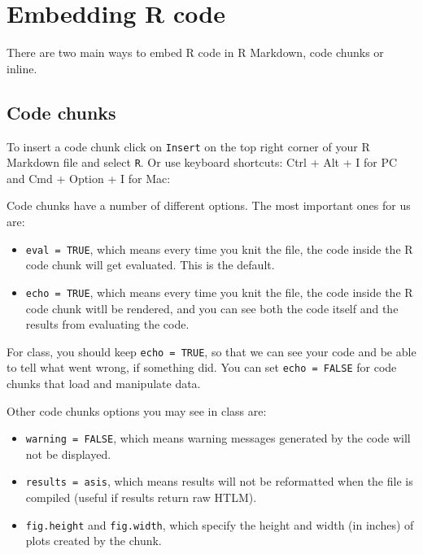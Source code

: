 \documentclass[
  letterpaper,
  DIV=11,
  numbers=noendperiod]{scrreprt}
\providecommand{\tightlist}{%
  \setlength{\itemsep}{0pt}\setlength{\parskip}{0pt}}\usepackage{longtable,booktabs,array}
\begin{document}
\section{Embedding R code}\label{embedding-r-code}

There are two main ways to embed R code in R Markdown, code chunks or
inline.

\subsection{Code chunks}\label{code-chunks}

To insert a code chunk click on \texttt{Insert} on the top right corner
of your R Markdown file and select \texttt{R}. Or use keyboard
shortcuts: Ctrl + Alt + I for PC and Cmd + Option + I for Mac:

Code chunks have a number of different options. The most important ones
for us are:

\begin{itemize}
\tightlist
\item
  \texttt{eval\ =\ TRUE}, which means every time you knit the file, the
  code inside the R code chunk will get evaluated. This is the default.
\item
  \texttt{echo\ =\ TRUE}, which means every time you knit the file, the
  code inside the R code chunk witll be rendered, and you can see both
  the code itself and the results from evaluating the code.
\end{itemize}

For class, you should keep \texttt{echo\ =\ TRUE}, so that we can see
your code and be able to tell what went wrong, if something did. You can
set \texttt{echo\ =\ FALSE} for code chunks that load and manipulate
data.

Other code chunks options you may see in class are:

\begin{itemize}
\tightlist
\item
  \texttt{warning\ =\ FALSE}, which means warning messages generated by
  the code will not be displayed.
\item
  \texttt{results\ =\ \textquotesingle{}asis\textquotesingle{}}, which
  means results will not be reformatted when the file is compiled
  (useful if results return raw HTLM).
\item
  \texttt{fig.height} and \texttt{fig.width}, which specify the height
  and width (in inches) of plots created by the chunk.
\end{itemize}
\end{document}

